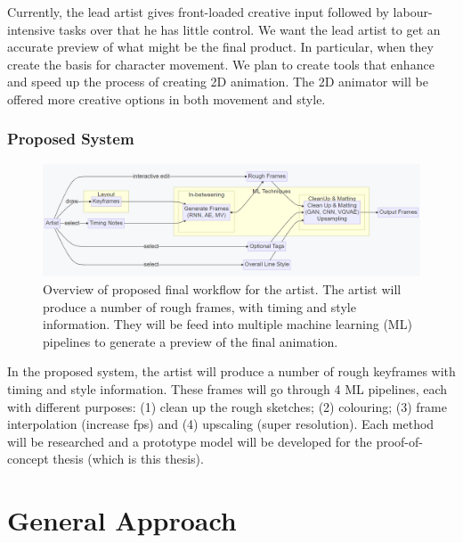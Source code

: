 Currently, the lead artist gives front-loaded creative input followed by labour-intensive tasks over that he has little control. We want the lead artist to get an accurate preview of what might be the final product. In particular, when they create the basis for character movement. We plan to create tools that enhance and speed up the process of creating 2D animation. The 2D animator will be offered more creative options in both movement and style.

\subsubsection{Proposed System}

\begin{figure}
    \centering
    \includegraphics[width=1\textwidth]{images/introduction/proposed_workflow.png}
    \caption{Overview of proposed final workflow for the artist. The artist will produce a number of rough frames, with timing and style information. They will be feed into multiple machine learning (ML) pipelines to generate a preview of the final animation.} 
    \label{fig:proposed_worflow}
\end{figure}

In the proposed system, the artist will produce a number of rough keyframes with timing and style information. These frames will go through 4 ML pipelines, each with different purposes: (1) clean up the rough sketches; (2) colouring; (3) frame interpolation (increase fps) and (4) upscaling (super resolution). Each method will be researched and a prototype model will be developed for the proof-of-concept thesis (which is this thesis).


\section{General Approach}
